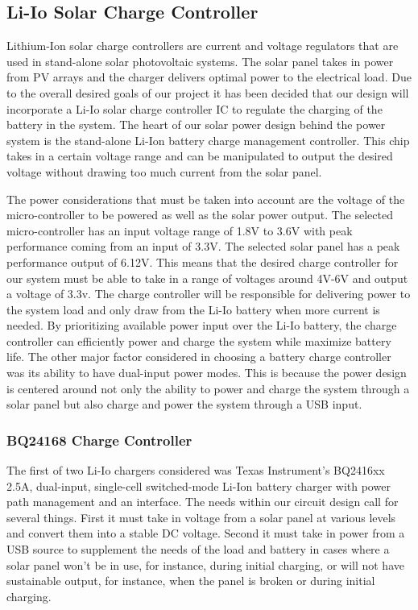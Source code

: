 \subsection{Li-Io Solar Charge Controller}
Lithium-Ion solar charge controllers are current and voltage regulators that are used in stand-alone solar photovoltaic systems. The solar panel takes in power from PV arrays and the charger delivers optimal power to the electrical load. Due to the overall desired goals of our project it has been decided that our design will incorporate a Li-Io solar charge controller IC to regulate the charging of the battery in the system. The heart of our solar power design behind the power system is the stand-alone Li-Ion battery charge management controller. This chip takes in a certain voltage range and can be manipulated to output the desired voltage without drawing too much current from the solar panel. 

The power considerations that must be taken into account are the voltage of the micro-controller to be powered as well as the solar power output. The selected micro-controller has an input voltage range of 1.8V to 3.6V with peak performance coming from an input of 3.3V. The selected solar panel has a peak performance output of 6.12V. This means that the desired charge controller for our system must be able to take in a range of voltages around 4V-6V and output a voltage of 3.3v. The charge controller will be responsible for delivering power to the system load and only draw from the Li-Io battery when more current is needed. By prioritizing available power input over the Li-Io battery, the charge controller can efficiently power and charge the system while maximize battery life. The other major factor considered in choosing a battery charge controller was its ability to have dual-input power modes. This is because the power design is centered around not only the ability to power and charge the system through a solar panel but also charge and power the system through a USB input.
\cite{Solar-Charge-Controller-Basics}
\subsubsection{BQ24168 Charge Controller}
The first of two Li-Io chargers considered was Texas Instrument's BQ2416xx 2.5A, dual-input, single-cell switched-mode Li-Ion battery charger with power path management and an \iic interface. The needs within our circuit design call for several things. First it must take in voltage from a solar panel at various levels and convert them into a stable DC voltage. Second it must take in power from a USB source to supplement the needs of the load and battery in cases where a solar panel won't be in use, for instance, during initial charging, or will not have sustainable output, for instance, when the panel is broken or during initial charging.


